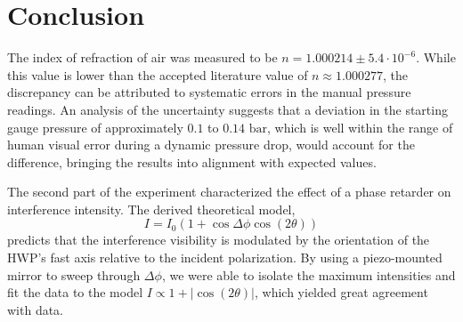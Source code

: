 \chapter{Conclusion}
%
The index of refraction of air was measured to be $n = 1.000214 \pm 5.4 \cdot 10^{-6}$. 
While this value is lower than the accepted literature value of $n \approx 1.000277$, 
the discrepancy can be attributed to systematic errors in the manual pressure readings. 
An analysis of the uncertainty suggests that a deviation in the starting gauge pressure of approximately $0.1$ to $0.14 \text{ bar}$, which is well within the range of human visual error during a dynamic pressure drop,
would account for the difference, bringing the results into alignment with expected values.

The second part of the experiment characterized the effect of a phase retarder on interference intensity. 
The derived theoretical model,
$$I = I_0 (1 + \cos\Delta \phi \cos(2\theta))$$
predicts that the interference visibility is modulated by the orientation of the HWP's fast axis relative to the incident polarization.
By using a piezo-mounted mirror to sweep through $\Delta \phi$, 
we were able to isolate the maximum intensities and fit the data to the model $I \propto 1 + |\cos(2\theta)|$, which yielded great agreement with data. 